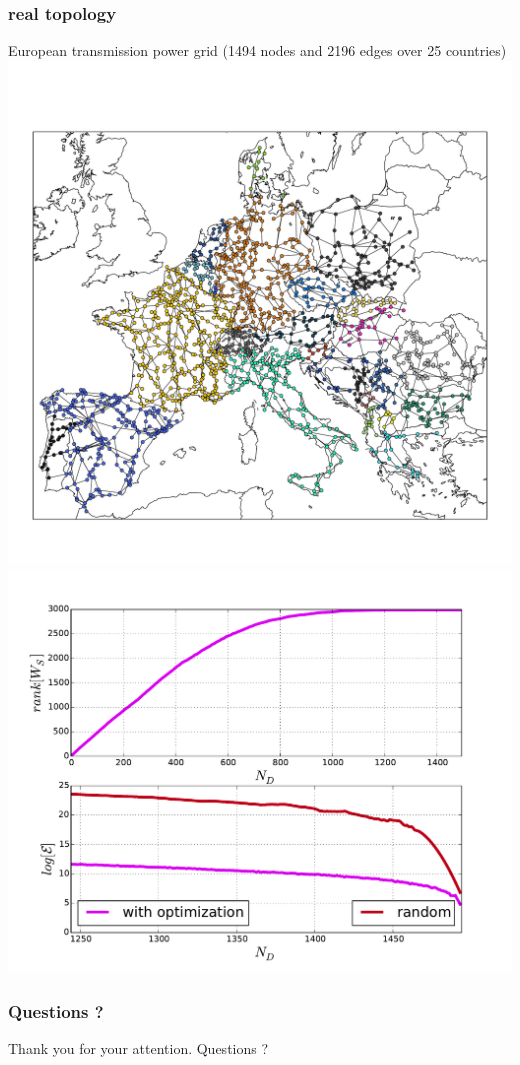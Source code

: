 \documentclass[xcolor=dvipsnames]{beamer}
\begin{document}
\begin{frame}
	\frametitle{real topology}
	
	{\footnotesize European transmission power grid (1494 nodes and 2196 edges over 25 countries) }
	\includegraphics[scale=.165]{power_grid}
	\includegraphics[scale=.26]{figs2}
\end{frame}

\begin{frame}
	\frametitle{Questions ?}
	
	\begin{center}
		Thank you for your attention. Questions ?
	\end{center}
\end{frame}
\end{document}

